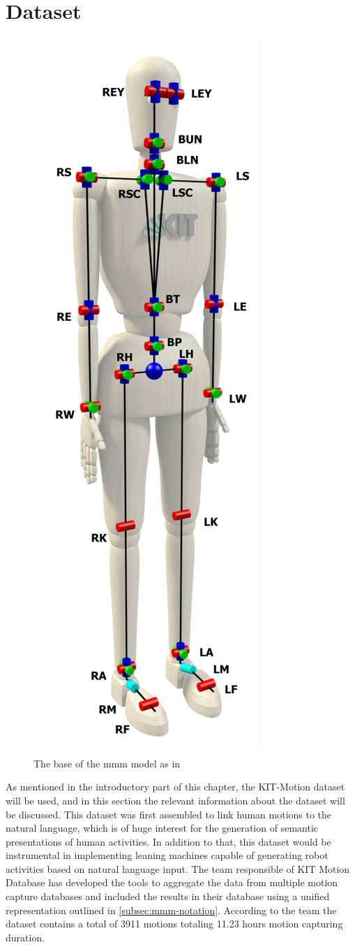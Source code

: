 \section{Dataset}
\begin{figure}
	\vspace{-1.5cm}
	\begin{center}
		\includegraphics[width=.25\textwidth]{img/mmm-model.png}
		\caption{The base of the mmm model as in \cite{Plappert2016}}
		\label{fig:mmm-model}
	\end{center}
\end{figure}
As mentioned in the introductory part of this chapter, the KIT-Motion dataset\cite{Plappert2016} will be used, and in this section the relevant information about the dataset will be discussed. This dataset was first assembled to link human motions to the natural language, which is of huge interest for the generation of semantic presentations of human activities. In addition to that, this dataset would be instrumental in implementing leaning machines capable of generating robot activities based on natural language input\cite{Plappert2016}. The team responsible of KIT Motion Database has developed the tools to aggregate the data from multiple motion capture databases and included the results in their database using a unified representation outlined in \ref{subsec:mmm-notation}. According to the team the dataset contains a total of 3911 motions totaling 11.23 hours motion capturing duration\cite{Plappert2016}.
